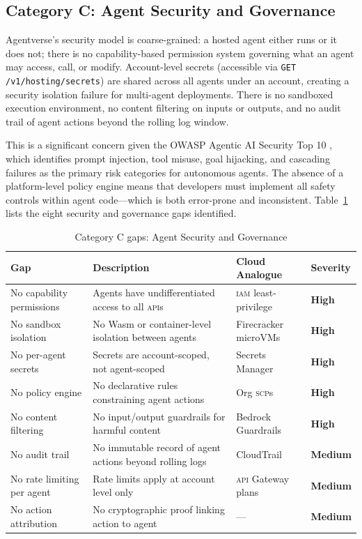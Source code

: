 \documentclass[twoside,11pt]{article}
\newcommand{\high}{\textcolor{red!70!black}{\textbf{High}}}
\newcommand{\medium}{\textcolor{orange!80!black}{\textbf{Medium}}}
\begin{document}
\subsection{Category C: Agent Security and Governance}
\label{subsec:gap-security}

Agentverse's security model is coarse-grained: a hosted agent either runs or
it does not; there is no capability-based permission system governing what an
agent may access, call, or modify.  Account-level secrets (accessible via
\texttt{GET /v1/hosting/secrets}) are shared across all agents under an
account, creating a security isolation failure for multi-agent deployments.
There is no sandboxed execution environment, no content filtering on inputs or
outputs, and no audit trail of agent actions beyond the rolling log window.

This is a significant concern given the OWASP Agentic AI Security Top 10
\citep{owasp2025agentic}, which identifies prompt injection, tool misuse, goal
hijacking, and cascading failures as the primary risk categories for autonomous
agents.  The absence of a platform-level policy engine means that developers
must implement all safety controls within agent code---which is both
error-prone and inconsistent.  Table~\ref{tab:gap-security} lists the eight
security and governance gaps identified.

\begin{table}[htbp]
\centering
\caption{Category C gaps: Agent Security and Governance}
\label{tab:gap-security}
\begin{tabular}{>{\raggedright\arraybackslash}p{3.2cm} >{\raggedright\arraybackslash}p{5.5cm} >{\raggedright\arraybackslash}p{2.9cm} l}
\toprule
\textbf{Gap} & \textbf{Description} & \textbf{Cloud Analogue} &
\textbf{Severity} \\
\midrule
No capability permissions & Agents have undifferentiated access to all
\textsc{api}s & \textsc{iam} least-privilege & \high \\
No sandbox isolation & No Wasm or container-level isolation between agents &
Firecracker microVMs & \high \\
No per-agent secrets & Secrets are account-scoped, not agent-scoped & Secrets
Manager & \high \\
No policy engine & No declarative rules constraining agent actions & Org
\textsc{scp}s & \high \\
No content filtering & No input/output guardrails for harmful content & Bedrock
Guardrails & \high \\
No audit trail & No immutable record of agent actions beyond rolling logs &
CloudTrail & \medium \\
No rate limiting per agent & Rate limits apply at account level only & \textsc{api}
Gateway plans & \medium \\
No action attribution & No cryptographic proof linking action to agent & --- &
\medium \\
\bottomrule
\end{tabular}
\end{table}
\end{document}
